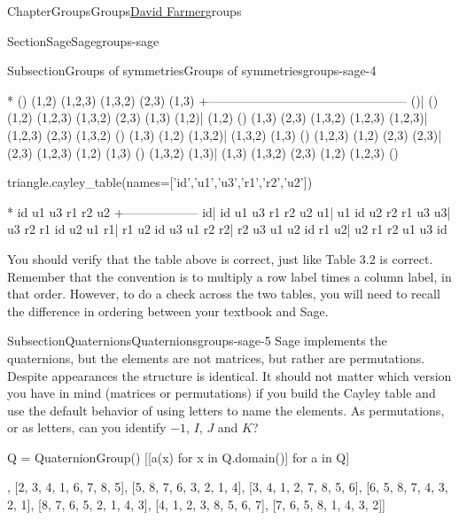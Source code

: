 \documentclass[oneside,10pt,]{book}
\numberwithin{equation}{section}
\begin{document}
\begin{chapterptx}{Chapter}{Groups}{}{Groups}{\hyperlink{dfarmer}{David Farmer}}{}{groups}
\begin{sectionptx}{Section}{Sage}{}{Sage}{}{}{groups-sage}
\begin{subsectionptx}{Subsection}{Groups of symmetries}{}{Groups of symmetries}{}{}{groups-sage-4}
\begin{sageoutput}
      *       ()   (1,2) (1,2,3) (1,3,2)   (2,3)   (1,3)
       +------------------------------------------------
     ()|      ()   (1,2) (1,2,3) (1,3,2)   (2,3)   (1,3)
  (1,2)|   (1,2)      ()   (1,3)   (2,3) (1,3,2) (1,2,3)
(1,2,3)| (1,2,3)   (2,3) (1,3,2)      ()   (1,3)   (1,2)
(1,3,2)| (1,3,2)   (1,3)      () (1,2,3)   (1,2)   (2,3)
  (2,3)|   (2,3) (1,2,3)   (1,2)   (1,3)      () (1,3,2)
  (1,3)|   (1,3) (1,3,2)   (2,3)   (1,2) (1,2,3)      ()
\end{sageoutput}
\begin{sageinput}
triangle.cayley_table(names=['id','u1','u3','r1','r2','u2'])
\end{sageinput}
\begin{sageoutput}
 *  id u1 u3 r1 r2 u2
  +------------------
id| id u1 u3 r1 r2 u2
u1| u1 id u2 r2 r1 u3
u3| u3 r2 r1 id u2 u1
r1| r1 u2 id u3 u1 r2
r2| r2 u3 u1 u2 id r1
u2| u2 r1 r2 u1 u3 id
\end{sageoutput}
You should verify that the table above is correct, just like Table 3.2 is correct.  Remember that the convention is to multiply a row label times a column label, in that order.  However, to do a check across the two tables, you will need to recall the difference in ordering between your textbook and Sage.%
\end{subsectionptx}
%
%
\typeout{************************************************}
\typeout{************************************************}
%
\begin{subsectionptx}{Subsection}{Quaternions}{}{Quaternions}{}{}{groups-sage-5}
Sage implements the quaternions, but the elements are not matrices, but rather are permutations.  Despite appearances the structure is identical.  It should not matter which version you have in mind (matrices or permutations) if you build the Cayley table and use the default behavior of using letters to name the elements.  As permutations, or as letters, can you identify \(-1\), \(I\), \(J\) and \(K\)?%
\begin{sageinput}
Q = QuaternionGroup()
[[a(x) for x in Q.domain()] for a in Q]
\end{sageinput}
\begin{sageoutput}
[[1, 2, 3, 4, 5, 6, 7, 8], [2, 3, 4, 1, 6, 7, 8, 5],
 [5, 8, 7, 6, 3, 2, 1, 4], [3, 4, 1, 2, 7, 8, 5, 6],
 [6, 5, 8, 7, 4, 3, 2, 1], [8, 7, 6, 5, 2, 1, 4, 3],
 [4, 1, 2, 3, 8, 5, 6, 7], [7, 6, 5, 8, 1, 4, 3, 2]]
\end{sageoutput}
\begin{sageinput}

\end{sageinput}
\end{subsectionptx}
\end{sectionptx}
\end{chapterptx}
\end{document}
